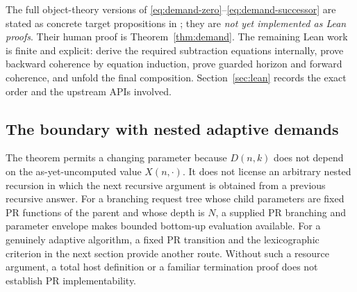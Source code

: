 The full object-theory versions of
\eqref{eq:demand-zero}--\eqref{eq:demand-successor} are stated as
concrete target propositions in ; they are
\emph{not yet implemented as Lean proofs}. Their human proof is
Theorem~\ref{thm:demand}. The remaining Lean work is finite and explicit:
derive the required subtraction equations internally, prove backward
coherence by equation induction, prove guarded horizon and forward
coherence, and unfold the final composition. Section~\ref{sec:lean}
records the exact order and the upstream APIs involved.

\subsection{The boundary with nested adaptive demands}

The theorem permits a changing parameter because \(D(n,k)\) does not
depend on the as-yet-uncomputed value \(X(n,\cdot)\). It does not
license an arbitrary nested recursion in which the next recursive
argument is obtained from a previous recursive answer. For a branching
request tree whose child parameters are fixed PR functions of the
parent and whose depth is \(N\), a supplied PR branching and parameter
envelope makes bounded bottom-up evaluation available. For a genuinely
adaptive algorithm, a fixed PR transition and the lexicographic
criterion in the next section provide another route. Without such a
resource argument, a total host definition or a familiar termination
proof does not establish PR implementability.
